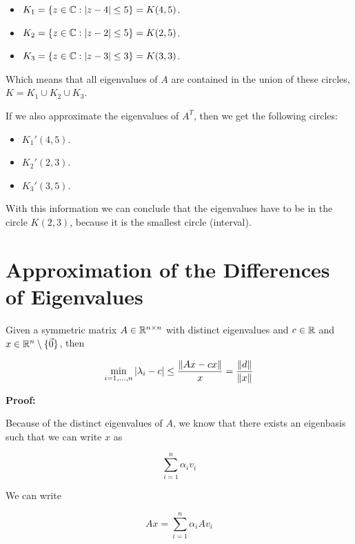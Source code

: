 \begin{itemize}

    \item \(K_1 = \{ z \in \mathbb{C} : |z - 4| \leq 5\} = K(4,5)\).

    \item \(K_2 = \{ z \in \mathbb{C} : |z - 2| \leq 5\} = K(2,5)\).

    \item \(K_3 = \{ z \in \mathbb{C} : |z - 3| \leq 3\} = K(3,3)\).

\end{itemize}

Which means that all eigenvalues of \(A\) are contained in the union of these circles, \(K = K_1 \cup K_2 \cup K_3\).

If we also approximate the eigenvalues of \(A^T\), then we get the following circles:

\begin{itemize}

    \item \(K_1'(4,5)\).

    \item \(K_2'(2,3)\).

    \item \(K_3'(3,5)\).

\end{itemize}

With this information we can conclude that the eigenvalues have to be in the circle \(K(2,3)\), because it is the smallest circle (interval).

\section{Approximation of the Differences of Eigenvalues}

Given a symmetric matrix \(A \in \mathbb{R}^{n \times n}\) with distinct eigenvalues and 
\(c \in \mathbb{R}\) and \(x \in \mathbb{R}^{n}\setminus \{\vec{0}\}\), then

\[
    \min_{i = 1, \dots, n} |\lambda_i - c| \le \frac{\left\| Ax - cx \right\|}{x} = \frac{\left\| d \right\|}{\left\| x \right\|}
\]

\textbf{Proof:}

Because of the distinct eigenvalues of \(A\), we know that there exists an eigenbasis such that we can write \(x\) as  

\[
    \sum_{i = 1 }^{n} \alpha_i v_i
\]

We can write  

\[
    Ax = \sum_{i = 1}^{n} \alpha_i A v_i
\]


